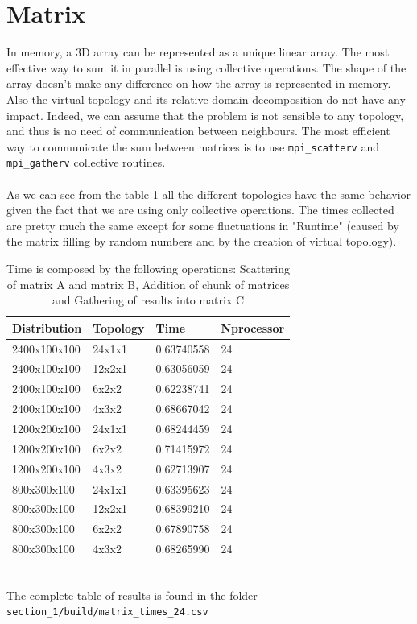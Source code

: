 \documentclass[11pt,a4paper]{article}
\begin{document}
\section{Matrix}
In memory, a 3D array can be represented as a unique linear array. The most effective way to sum it in parallel is using collective operations. The shape of the array doesn't make any difference on how the array is represented in memory. Also the virtual topology and its relative domain decomposition do not have any impact. Indeed, we can assume that the problem is not sensible to any topology, and thus is no need of communication between neighbours. The most efficient way to communicate the sum between matrices is to use \texttt{mpi\_scatterv} and \texttt{mpi\_gatherv} collective routines. \\
\\
As we can see from the table \ref{matrix_result} all the different topologies have the same behavior given the fact that we are using only collective operations. The times collected are pretty much the same except for some fluctuations in "Runtime" (caused by the matrix filling by random numbers and by the creation of virtual topology).
\begin{table}[!ht]
    \centering
    \begin{tabular}{|l|l|l|l|}
    \hline
        Distribution & Topology & Time & Nprocessor \\ \hline
        2400x100x100 & 24x1x1 & 0.63740558 & 24 \\ \hline
        2400x100x100 & 12x2x1 & 0.63056059 & 24 \\ \hline
        2400x100x100 & 6x2x2 & 0.62238741 & 24 \\ \hline
        2400x100x100 & 4x3x2 & 0.68667042 & 24 \\ \hline
        1200x200x100 & 24x1x1 & 0.68244459 & 24 \\ \hline
        1200x200x100 & 6x2x2 & 0.71415972 & 24 \\ \hline
        1200x200x100 & 4x3x2 & 0.62713907 & 24 \\ \hline
        800x300x100 & 24x1x1 & 0.63395623 & 24 \\ \hline
        800x300x100 & 12x2x1 & 0.68399210 & 24 \\ \hline
        800x300x100 & 6x2x2 & 0.67890758 & 24 \\ \hline
        800x300x100 & 4x3x2 & 0.68265990 & 24 \\ \hline
    \end{tabular}
    \caption{Time is composed by the following operations: Scattering of matrix A and matrix B, Addition of chunk of matrices and Gathering of results into matrix C}
    \label{matrix_result}
\end{table}
\\ The complete table of results is found in the folder \texttt{section\_1/build/matrix\_times\_24.csv}
\newpage
\end{document}
